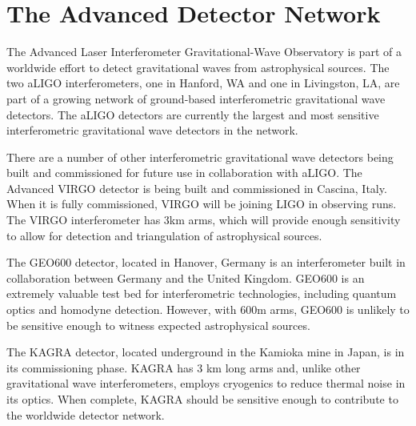 \section{The Advanced Detector Network}

The Advanced Laser Interferometer Gravitational-Wave Observatory is 
part of a worldwide effort to detect gravitational waves from astrophysical 
sources. The two aLIGO interferometers, one in Hanford, WA and one in 
Livingston, LA, are part of a growing network of ground-based interferometric 
gravitational wave detectors. The aLIGO detectors are currently the largest 
and most sensitive interferometric gravitational wave detectors in the 
network.

There are a number of other interferometric gravitational wave detectors 
being built and commissioned for future use in collaboration with aLIGO.
The Advanced VIRGO detector is being built and commissioned in Cascina, Italy. 
When it is fully commissioned, VIRGO will be joining LIGO in observing runs. 
The VIRGO interferometer has 3km arms, which will provide enough 
sensitivity to allow for detection and triangulation of astrophysical sources.

The GEO600 detector, located in Hanover, Germany is an interferometer built in 
collaboration between Germany and the United Kingdom. 
GEO600 is an extremely valuable test bed for interferometric technologies,
including quantum optics and homodyne detection. However, with 600m arms, GEO600 
is unlikely to be sensitive enough to witness expected astrophysical sources.

The KAGRA detector, located underground in the Kamioka mine in Japan, 
is in its commissioning phase. KAGRA has 3 km long arms and, 
unlike other gravitational wave interferometers, employs cryogenics to 
reduce thermal noise in its optics. When complete, KAGRA should be 
sensitive enough to contribute to the worldwide detector network.

